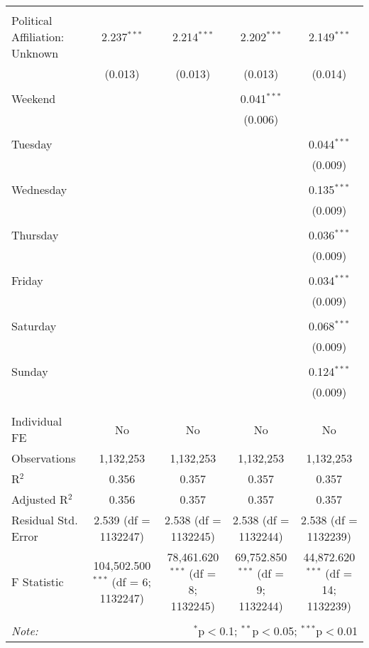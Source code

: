 \documentclass[
]{article}
\begin{document}
\begin{table}[!htbp]
{\begin{tabular}{@{\extracolsep{5pt}}lcccc}
  & & & & \\ 
 Political Affiliation: Unknown & 2.237$^{***}$ & 2.214$^{***}$ & 2.202$^{***}$ & 2.149$^{***}$ \\ 
  & (0.013) & (0.013) & (0.013) & (0.014) \\ 
  & & & & \\ 
 Weekend &  &  & 0.041$^{***}$ &  \\ 
  &  &  & (0.006) &  \\ 
  & & & & \\ 
 Tuesday &  &  &  & 0.044$^{***}$ \\ 
  &  &  &  & (0.009) \\ 
  & & & & \\ 
 Wednesday &  &  &  & 0.135$^{***}$ \\ 
  &  &  &  & (0.009) \\ 
  & & & & \\ 
 Thursday &  &  &  & 0.036$^{***}$ \\ 
  &  &  &  & (0.009) \\ 
  & & & & \\ 
 Friday &  &  &  & 0.034$^{***}$ \\ 
  &  &  &  & (0.009) \\ 
  & & & & \\ 
 Saturday &  &  &  & 0.068$^{***}$ \\ 
  &  &  &  & (0.009) \\ 
  & & & & \\ 
 Sunday &  &  &  & 0.124$^{***}$ \\ 
  &  &  &  & (0.009) \\ 
  & & & & \\ 
\hline \\[-1.8ex] 
Individual FE & No & No & No & No \\ 
Observations & 1,132,253 & 1,132,253 & 1,132,253 & 1,132,253 \\ 
R$^{2}$ & 0.356 & 0.357 & 0.357 & 0.357 \\ 
Adjusted R$^{2}$ & 0.356 & 0.357 & 0.357 & 0.357 \\ 
Residual Std. Error & 2.539 (df = 1132247) & 2.538 (df = 1132245) & 2.538 (df = 1132244) & 2.538 (df = 1132239) \\ 
F Statistic & 104,502.500$^{***}$ (df = 6; 1132247) & 78,461.620$^{***}$ (df = 8; 1132245) & 69,752.850$^{***}$ (df = 9; 1132244) & 44,872.620$^{***}$ (df = 14; 1132239) \\ 
\hline 
\hline \\[-1.8ex] 
\textit{Note:}  & \multicolumn{4}{r}{$^{*}$p$<$0.1; $^{**}$p$<$0.05; $^{***}$p$<$0.01} \\ 
\end{tabular}
} 
\end{table} 
\newpage
\end{document}
